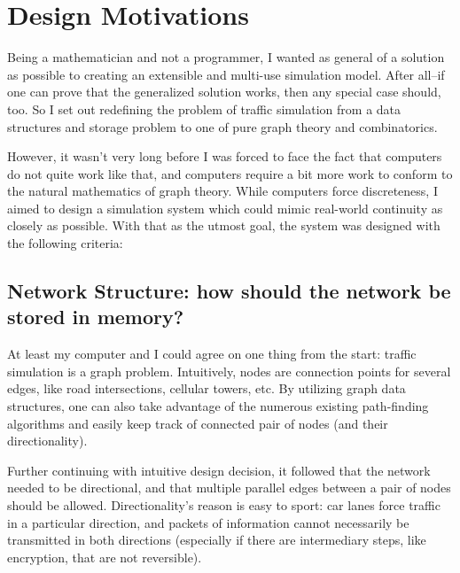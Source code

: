 \chapter{Design Motivations}
\label{Motivations}

\par Being a mathematician and not a programmer, I wanted as general of a solution as possible to creating an extensible and multi-use simulation model.  After all--if one can prove that the generalized solution works, then any special case should, too.  So I set out redefining the problem of traffic simulation from a data structures and storage problem to one of pure graph theory and combinatorics. \\

\par  However, it wasn't very long before I was forced to face the fact that computers do not quite work like that, and computers require a bit more work to conform to the natural mathematics of graph theory.  While computers force discreteness, I aimed to design a simulation system which could mimic real-world continuity as closely as possible.  With that as the utmost goal, the system was designed with the following criteria: \\


\section{Network Structure:  how should the network be stored in memory?}
\par At least my computer and I could agree on one thing from the start:  traffic simulation is a graph problem.  Intuitively, nodes are connection points for several edges, like road intersections, cellular towers, etc.  By utilizing graph data structures, one can also take advantage of the numerous existing path-finding algorithms and easily keep track of connected pair of nodes (and their directionality). \\

\par Further continuing with intuitive design decision, it followed that the network needed to be directional, and that multiple parallel edges between a pair of nodes should be allowed.  Directionality's reason is easy to sport:  car lanes force traffic in a particular direction, and packets of information cannot necessarily be transmitted in both directions (especially if there are intermediary steps, like encryption, that are not reversible). \\  


